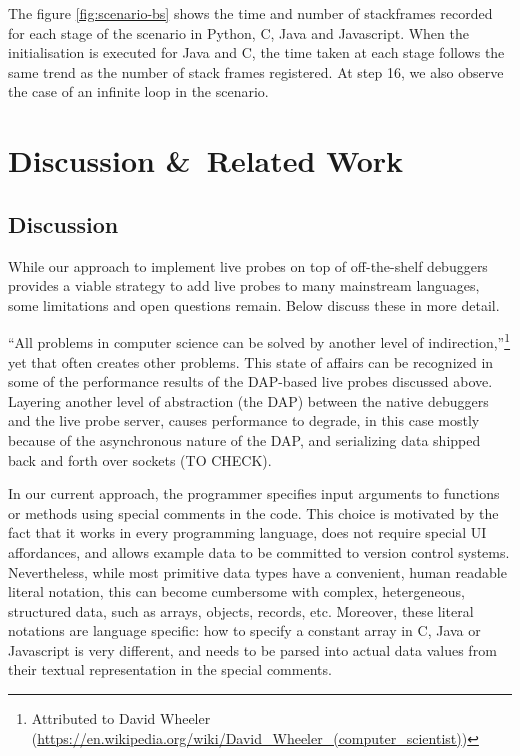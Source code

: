 \documentclass[english,submission]{programming}
\begin{document}
The figure \ref{fig:scenario-bs} shows the time and number of stackframes recorded for each stage of the scenario in Python, C, Java and Javascript. 
When the initialisation is executed for Java and C, the time taken at each stage follows the same trend as the number of stack frames registered. 
At step 16, we also observe the case of an infinite loop in the scenario.


\section{Discussion \&\ Related Work}
\label{sec:related-work}

\subsection{Discussion}

While our approach to implement live probes on top of off-the-shelf debuggers provides a viable strategy to add live probes to many mainstream languages, some limitations and open questions remain. Below discuss these in more detail.

``All problems in computer science can be solved by another level of indirection,''\footnote{Attributed to David Wheeler (\url{https://en.wikipedia.org/wiki/David_Wheeler_(computer_scientist)})} yet that often creates other problems. This state of affairs can be recognized in some of the performance results of the DAP-based live probes discussed above. Layering another level of abstraction (the DAP) between the native debuggers and the live probe server, causes performance to degrade, in this case mostly because of the asynchronous nature of the DAP, and serializing data shipped back and forth over sockets (TO CHECK). 


In our current approach, the programmer specifies input arguments to functions or methods using special comments in the code. This choice is motivated by the fact that it works in every programming language, does not require special UI affordances, and allows example data to be committed to version control systems. Nevertheless, while most primitive data types have a convenient, human readable literal notation, this can become cumbersome with complex, hetergeneous, structured data, such as arrays, objects, records, etc.  Moreover, these literal notations are language specific: how to specify a constant array in C, Java or Javascript is very different, and needs to be parsed into actual data values from their textual representation in the special comments. 
\end{document}
